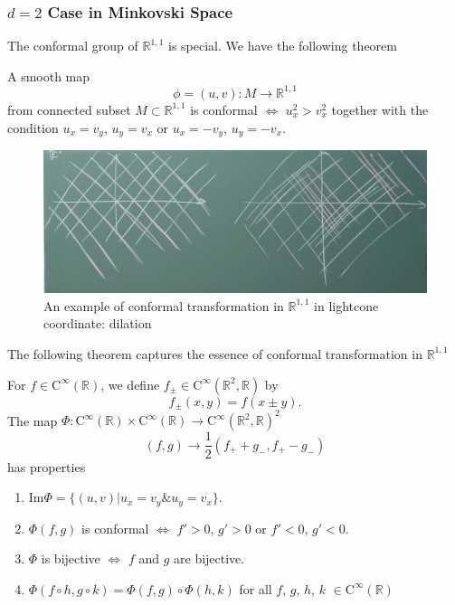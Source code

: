 \documentclass[a4paper,11pt]{article}
\begin{document}
\subsubsection{$d=2$ Case in Minkovski Space}
The conformal group of $\mathbb{R}^{1,1}$ is special. We have the following theorem
\begin{framed}
A smooth map 
\begin{equation}
    \phi=(u,v):M\rightarrow\mathbb{R}^{1,1}
\end{equation}
from connected subset $M\subset\mathbb{R}^{1,1}$ is conformal $\iff$ $u_x^2>v_x^2$ together with the condition $u_x=v_y$, $u_y=v_x$ or $u_x=-v_y$, $u_y=-v_x$.
\end{framed}
\begin{figure}
    \centering
    \includegraphics[scale=0.3]{dilationinR11.jpg}
    \caption{An example of conformal transformation in $\mathbb{R}^{1,1}$ in lightcone coordinate: dilation} 
\end{figure}
The following theorem captures the essence of conformal transformation in $\mathbb{R}^{1,1}$
\begin{framed}
For $f\in \mathrm{C}^\infty(\mathbb{R})$, we define $f_{\pm}\in \mathrm{C}^\infty(\mathbb{R}^2,\mathbb{R})$ by
\begin{equation*}
    f_{\pm}(x,y)=f(x\pm y).
\end{equation*}
The map $\Phi:\mathrm{C}^\infty(\mathbb{R})\times\mathrm{C}^\infty(\mathbb{R})\rightarrow \mathrm{C}^\infty(\mathbb{R}^2,\mathbb{R})^2$
\begin{equation}
    (f,g)\rightarrow\frac{1}{2}(f_++g_-,f_+-g_-)
\end{equation}
has properties
\begin{enumerate}
    \item $\mathrm{Im}\Phi=\{(u,v)|u_x=v_y\& u_y=v_x\}$.
    \item $\Phi(f,g)$ is conformal $\iff$ $f'>0$, $g'>0$ or $f'<0$, $g'<0$.
    \item $\Phi$ is bijective $\iff$ $f$ and $g$ are bijective.
    \item $\Phi(f\circ h,g\circ k)=\Phi(f,g)\circ\Phi(h,k)$ for all $f$, $g$, $h$, $k$ $\in\mathrm{C}^\infty(\mathbb{R})$
\end{enumerate}
\end{framed}
\end{document}
